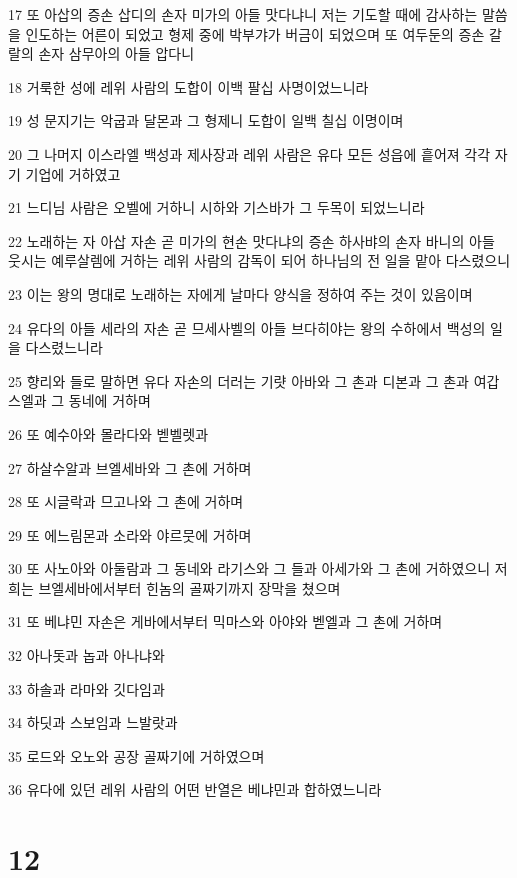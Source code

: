 \par 17 또 아삽의 증손 삽디의 손자 미가의 아들 맛다냐니 저는 기도할 때에 감사하는 말씀을 인도하는 어른이 되었고 형제 중에 박부갸가 버금이 되었으며 또 여두둔의 증손 갈랄의 손자 삼무아의 아들 압다니
\par 18 거룩한 성에 레위 사람의 도합이 이백 팔십 사명이었느니라
\par 19 성 문지기는 악굽과 달몬과 그 형제니 도합이 일백 칠십 이명이며
\par 20 그 나머지 이스라엘 백성과 제사장과 레위 사람은 유다 모든 성읍에 흩어져 각각 자기 기업에 거하였고
\par 21 느디님 사람은 오벨에 거하니 시하와 기스바가 그 두목이 되었느니라
\par 22 노래하는 자 아삽 자손 곧 미가의 현손 맛다냐의 증손 하사뱌의 손자 바니의 아들 웃시는 예루살렘에 거하는 레위 사람의 감독이 되어 하나님의 전 일을 맡아 다스렸으니
\par 23 이는 왕의 명대로 노래하는 자에게 날마다 양식을 정하여 주는 것이 있음이며
\par 24 유다의 아들 세라의 자손 곧 므세사벨의 아들 브다히야는 왕의 수하에서 백성의 일을 다스렸느니라
\par 25 향리와 들로 말하면 유다 자손의 더러는 기럇 아바와 그 촌과 디본과 그 촌과 여갑스엘과 그 동네에 거하며
\par 26 또 예수아와 몰라다와 벧벨렛과
\par 27 하살수알과 브엘세바와 그 촌에 거하며
\par 28 또 시글락과 므고나와 그 촌에 거하며
\par 29 또 에느림몬과 소라와 야르뭇에 거하며
\par 30 또 사노아와 아둘람과 그 동네와 라기스와 그 들과 아세가와 그 촌에 거하였으니 저희는 브엘세바에서부터 힌놈의 골짜기까지 장막을 쳤으며
\par 31 또 베냐민 자손은 게바에서부터 믹마스와 아야와 벧엘과 그 촌에 거하며
\par 32 아나돗과 놉과 아나냐와
\par 33 하솔과 라마와 깃다임과
\par 34 하딧과 스보임과 느발랏과
\par 35 로드와 오노와 공장 골짜기에 거하였으며
\par 36 유다에 있던 레위 사람의 어떤 반열은 베냐민과 합하였느니라

\chapter{12}

